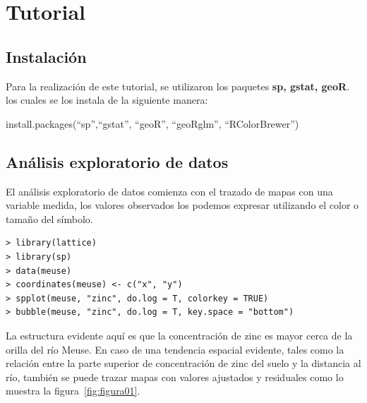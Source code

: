 \chapter{Tutorial}

\section{Instalación}

Para la realización de este tutorial, se utilizaron los paquetes \textbf{sp, gstat, geoR}. los cuales se los instala de la siguiente manera:

install.packages(``sp'',``gstat'', ``geoR'', ``geoRglm'', ``RColorBrewer'')

\section{Análisis exploratorio de datos}

El análisis exploratorio de datos comienza con el trazado de mapas con una variable medida, los valores observados los podemos expresar
utilizando el color o tamaño del símbolo.\\

\begin{lstlisting}
> library(lattice)
> library(sp)
> data(meuse)
> coordinates(meuse) <- c("x", "y")
> spplot(meuse, "zinc", do.log = T, colorkey = TRUE)
> bubble(meuse, "zinc", do.log = T, key.space = "bottom")
\end{lstlisting}

La estructura evidente aquí es que la concentración de zinc es mayor cerca de la
orilla del río Meuse. En caso de una tendencia espacial evidente, tales como la relación
entre la parte superior de concentración de zinc del suelo y la distancia al río, también 
se puede trazar mapas con valores ajustados y residuales como lo muestra la figura~\ref{fig:figura01}.

